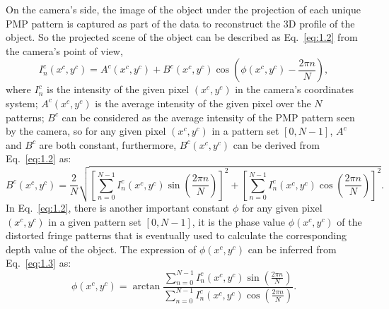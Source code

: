 \documentclass[]{spie}  %
\begin{document}
On the camera's side, the image of  the object under the projection of each unique PMP pattern is captured as part of the data to reconstruct the 3D profile of the object. So the projected scene of the object can be described as Eq.~\eqref{eq:1.2} from the camera's point of view, 
 \begin{equation} \label{eq:1.2}
  	I^c_n(x^c, y^c) =  A^c(x^c, y^c) + B^c(x^c, y^c)\cos\left(\phi(x^c, y^c) - \frac{2\pi n}{N}\right),
  \end{equation}
where $I^c_n$ is the intensity of the given pixel $(x^c, y^c)$ in the camera's coordinates system; $A^c(x^c, y^c)$ is the average intensity of the given pixel over the $N$ patterns; $B^c$ can be considered as the average intensity of the PMP pattern seen by the camera, so for any given pixel $(x^c, y^c)$ in a pattern set $[0, N-1]$, $A^c$ and $B^c$ are both constant, furthermore, $B^c(x^c, y^c)$ can be derived from Eq.~\eqref{eq:1.2} as:
  \begin{equation} \label{eq:1.3}
  	B^c(x^c, y^c) = \frac{2}{N}\sqrt{\left[\sum_{n=0}^{N-1}I_n^c(x^c, y^c)\sin (\frac{2\pi n}{N})\right]^2 + \left[\sum_{n=0}^{N-1}I_n^c(x^c, y^c)\cos (\frac{2\pi n}{N})\right]^2}.
  \end{equation}
In Eq.~\ref{eq:1.2}, there is another important constant $\phi$ for any given pixel $(x^c, y^c)$ in a given pattern set $[0, N-1]$, it is the phase value $\phi (x^c, y^c)$ of the distorted fringe patterns that is eventually used to calculate the corresponding depth value of the object. The expression of $\phi (x^c, y^c)$ can be inferred from Eq.~\eqref{eq:1.3} as:
  \begin{equation} \label{eq:1.4}
  	\phi (x^c, y^c) = \arctan \frac{\sum_{n=0}^{N-1} I^c_n(x^c, y^c)\sin(\frac{2\pi n}{N})}{\sum_{n=0}^{N-1} I^c_n(x^c, y^c)\cos(\frac{2\pi n}{N})}.
  \end{equation}
\end{document}
